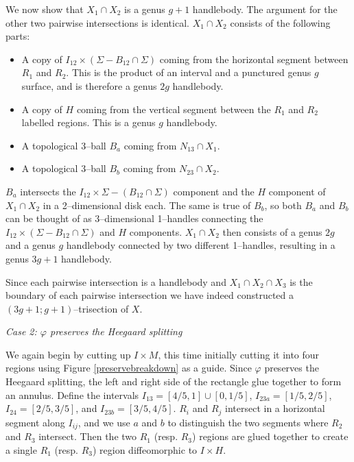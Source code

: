 \documentclass[12pt]{amsart}
\theoremstyle{definition}
\theoremstyle{remark}
\begin{document}
We now show that $X_1 \cap X_2$ is a genus $g+1$ handlebody.  The argument for the other two pairwise intersections is identical.  $X_1 \cap X_2$ consists of the following parts:

\begin{itemize}
\item A copy of $I_{12} \times (\Sigma - B_{12} \cap \Sigma)$ coming from the horizontal segment between $R_1$ and $R_2$.  This is the product of an interval and a punctured genus $g$ surface, and is therefore a genus $2g$ handlebody.  
\item A copy of $H$ coming from the vertical segment between the $R_1$ and $R_2$ labelled regions.  This is a genus $g$ handlebody.
\item A topological 3--ball $B_a$ coming from $N_{13} \cap X_1$.
\item A topological 3--ball $B_b$ coming from $N_{23} \cap X_2$.
\end{itemize}

$B_a$ intersects the $I_{12} \times \Sigma - (B_{12} \cap \Sigma)$ component and the $H$ component of $X_1 \cap X_2$ in a 2--dimensional disk each.  The same is true of $B_b$, so both $B_a$ and $B_b$ can be thought of as 3--dimensional 1--handles connecting the $I_{12} \times (\Sigma - B_{12} \cap \Sigma)$ and $H$ components.  $X_1 \cap X_2$ then consists of a genus $2g$ and a genus $g$ handlebody connected by two different 1--handles, resulting in a genus $3g+1$ handlebody. 

Since each pairwise intersection is a handlebody and $X_1 \cap X_2 \cap X_3$ is the boundary of each pairwise intersection we have indeed constructed a $(3g+1;g+1)$--trisection of $X$.


\smallskip
\noindent\textit{Case 2: $\varphi$ preserves the Heegaard splitting}\ \ 

We again begin by cutting up $I \times M$, this time initially cutting it into four regions using Figure \ref{preservebreakdown} as a guide.  Since $\varphi$ preserves the Heegaard splitting, the left and right side of the rectangle glue together to form an annulus.  Define the intervals $I_{13} = [4/5,1] \cup [0,1/5]$, $I_{23a} = [1/5,2/5]$, $I_{24} = [2/5,3/5]$, and $I_{23b} = [3/5,4/5]$.  $R_i$ and $R_j$ intersect in a horizontal segment along $I_{ij}$, and we use $a$ and $b$ to distinguish the two segments where $R_2$ and $R_3$ intersect.  Then the two $R_1$ (resp. $R_3$) regions are glued together to create a single $R_1$ (resp. $R_3$) region diffeomorphic to $I \times H$.  
\end{document}
